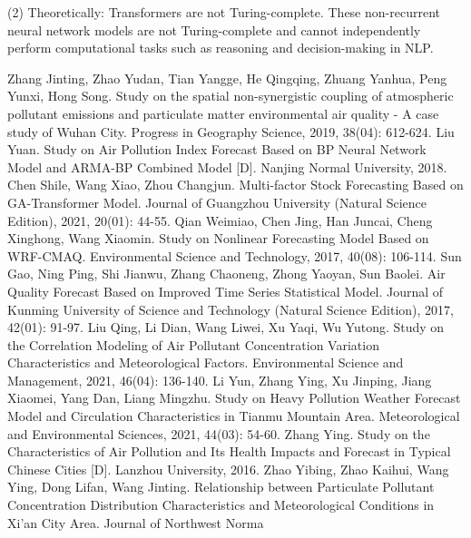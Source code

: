 \documentclass[12pt]{article}
\begin{document}
(2) Theoretically: Transformers are not Turing-complete. These non-recurrent neural network models are not Turing-complete and cannot independently perform computational tasks such as reasoning and decision-making in NLP.




\clearpage  
\begin{thebibliography}{99}
     Zhang Jinting, Zhao Yudan, Tian Yangge, He Qingqing, Zhuang Yanhua, Peng Yunxi, Hong Song. Study on the spatial non-synergistic coupling of atmospheric pollutant emissions and particulate matter environmental air quality - A case study of Wuhan City. Progress in Geography Science, 2019, 38(04): 612-624.
	 Liu Yuan. Study on Air Pollution Index Forecast Based on BP Neural Network Model and ARMA-BP Combined Model [D]. Nanjing Normal University, 2018.
	 Chen Shile, Wang Xiao, Zhou Changjun. Multi-factor Stock Forecasting Based on GA-Transformer Model. Journal of Guangzhou University (Natural Science Edition), 2021, 20(01): 44-55.
	 Qian Weimiao, Chen Jing, Han Juncai, Cheng Xinghong, Wang Xiaomin. Study on Nonlinear Forecasting Model Based on WRF-CMAQ. Environmental Science and Technology, 2017, 40(08): 106-114.
	 Sun Gao, Ning Ping, Shi Jianwu, Zhang Chaoneng, Zhong Yaoyan, Sun Baolei. Air Quality Forecast Based on Improved Time Series Statistical Model. Journal of Kunming University of Science and Technology (Natural Science Edition), 2017, 42(01): 91-97.
	 Liu Qing, Li Dian, Wang Liwei, Xu Yaqi, Wu Yutong. Study on the Correlation Modeling of Air Pollutant Concentration Variation Characteristics and Meteorological Factors. Environmental Science and Management, 2021, 46(04): 136-140.
	 Li Yun, Zhang Ying, Xu Jinping, Jiang Xiaomei, Yang Dan, Liang Mingzhu. Study on Heavy Pollution Weather Forecast Model and Circulation Characteristics in Tianmu Mountain Area. Meteorological and Environmental Sciences, 2021, 44(03): 54-60.
	 Zhang Ying. Study on the Characteristics of Air Pollution and Its Health Impacts and Forecast in Typical Chinese Cities [D]. Lanzhou University, 2016.
	 Zhao Yibing, Zhao Kaihui, Wang Ying, Dong Lifan, Wang Jinting. Relationship between Particulate Pollutant Concentration Distribution Characteristics and Meteorological Conditions in Xi'an City Area. Journal of Northwest Norma
\end{thebibliography}
\end{document}
